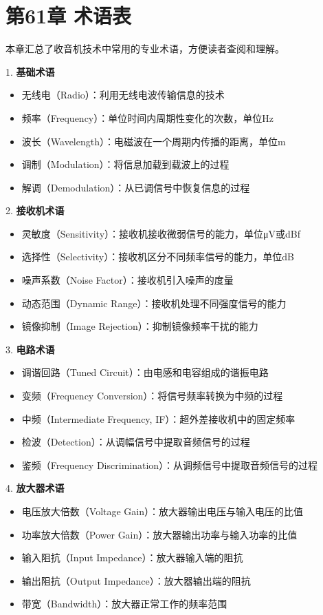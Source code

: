 \documentclass[12pt,UTF8]{ctexbook}
\begin{document}
\chapter*{第61章 术语表}

本章汇总了收音机技术中常用的专业术语，方便读者查阅和理解。

1. \textbf{基础术语}
   \begin{itemize}[leftmargin=3.5em]
   \item 无线电（Radio）：利用无线电波传输信息的技术
   \item 频率（Frequency）：单位时间内周期性变化的次数，单位Hz
   \item 波长（Wavelength）：电磁波在一个周期内传播的距离，单位m
   \item 调制（Modulation）：将信息加载到载波上的过程
   \item 解调（Demodulation）：从已调信号中恢复信息的过程
   \end{itemize}

2. \textbf{接收机术语}
   \begin{itemize}[leftmargin=3.5em]
   \item 灵敏度（Sensitivity）：接收机接收微弱信号的能力，单位μV或dBf
   \item 选择性（Selectivity）：接收机区分不同频率信号的能力，单位dB
   \item 噪声系数（Noise Factor）：接收机引入噪声的度量
   \item 动态范围（Dynamic Range）：接收机处理不同强度信号的能力
   \item 镜像抑制（Image Rejection）：抑制镜像频率干扰的能力
   \end{itemize}

3. \textbf{电路术语}
   \begin{itemize}[leftmargin=3.5em]
   \item 调谐回路（Tuned Circuit）：由电感和电容组成的谐振电路
   \item 变频（Frequency Conversion）：将信号频率转换为中频的过程
   \item 中频（Intermediate Frequency, IF）：超外差接收机中的固定频率
   \item 检波（Detection）：从调幅信号中提取音频信号的过程
   \item 鉴频（Frequency Discrimination）：从调频信号中提取音频信号的过程
   \end{itemize}

4. \textbf{放大器术语}
   \begin{itemize}[leftmargin=3.5em]
   \item 电压放大倍数（Voltage Gain）：放大器输出电压与输入电压的比值
   \item 功率放大倍数（Power Gain）：放大器输出功率与输入功率的比值
   \item 输入阻抗（Input Impedance）：放大器输入端的阻抗
   \item 输出阻抗（Output Impedance）：放大器输出端的阻抗
   \item 带宽（Bandwidth）：放大器正常工作的频率范围
   \end{itemize}
\end{document}
